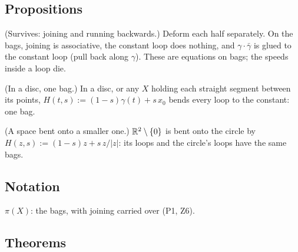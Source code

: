 \subsection*{Propositions}

\begin{lines}
\item[\lab{P1}] (Survives: joining and running backwards.) Deform each half separately. On the bags, joining is associative, the constant loop does nothing, and $\gamma \cdot \bar\gamma$ is glued to the constant loop (pull back along $\gamma$). These are equations on bags; the speeds inside a loop die.
\item[\lab{P2}] (In a disc, one bag.) In a disc, or any $X$ holding each straight segment between its points, $H(t, s) := (1 - s)\gamma(t) + s\,x_0$ bends every loop to the constant: one bag.
\item[\lab{P3}] (A space bent onto a smaller one.) $\mathbb{R}^2 \setminus \{0\}$ is bent onto the circle by $H(z, s) := (1 - s)z + s\,z / |z|$: its loops and the circle's loops have the same bags.
\end{lines}

\subsection*{Notation}

\begin{lines}
\item[\lab{N1}] $\pi(X)$: the bags, with joining carried over (P1, Z6).
\end{lines}

\subsection*{Theorems}

